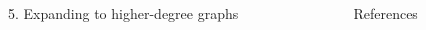 \documentclass[]{templates/poster}
\begin{document}
\begin{frame}{}
\begin{columns}[t]
  \begin{column}{0.422\linewidth}
  \begin{block}{5. Expanding to higher-degree graphs}
  \end{block}
  \end{column}
  \begin{column}{0.422\linewidth}
  \begin{block}{References}
  \end{block}
  \end{column}
\end{columns}

\end{frame}

\end{document}
